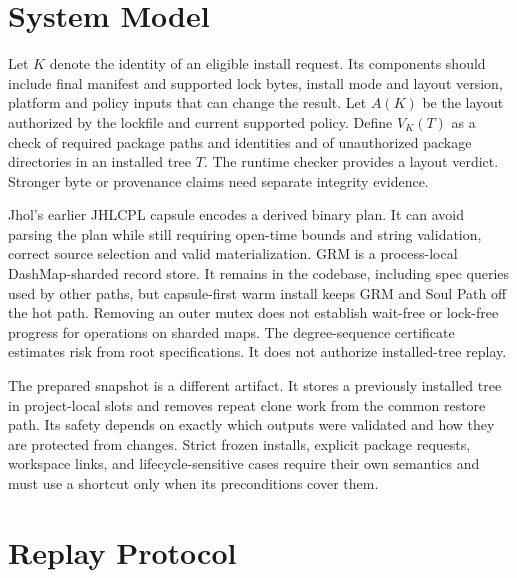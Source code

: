 \documentclass[
  11pt,
  letterpaper,
]{article}
\begin{document}
\section{System Model}\label{system-model}

Let \(K\) denote the identity of an eligible install request. Its
components should include final manifest and supported lock bytes,
install mode and layout version, platform and policy inputs that can
change the result. Let \(A(K)\) be the layout authorized by the lockfile
and current supported policy. Define \(V_K(T)\) as a check of required
package paths and identities and of unauthorized package directories in
an installed tree \(T\). The runtime checker provides a layout verdict.
Stronger byte or provenance claims need separate integrity evidence.

Jhol's earlier JHLCPL capsule encodes a derived binary plan. It can
avoid parsing the plan while still requiring open-time bounds and string
validation, correct source selection and valid materialization. GRM is a
process-local DashMap-sharded record store. It remains in the codebase,
including spec queries used by other paths, but capsule-first warm
install keeps GRM and Soul Path off the hot path. Removing an outer
mutex does not establish wait-free or lock-free progress for operations
on sharded maps. The degree-sequence certificate estimates risk from
root specifications. It does not authorize installed-tree replay.

The prepared snapshot is a different artifact. It stores a previously
installed tree in project-local slots and removes repeat clone work from
the common restore path. Its safety depends on exactly which outputs
were validated and how they are protected from changes. Strict frozen
installs, explicit package requests, workspace links, and
lifecycle-sensitive cases require their own semantics and must use a
shortcut only when its preconditions cover them.

\section{Replay Protocol}\label{replay-protocol}
\end{document}
